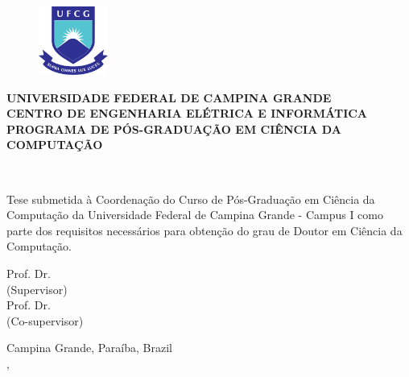\begin{figure}[H]
\centering
\includegraphics[height=85px]{images/logo_ufcg.png}
\end{figure}

\begin{center}
\textbf{UNIVERSIDADE FEDERAL DE CAMPINA GRANDE} \\
\textbf{CENTRO DE ENGENHARIA ELÉTRICA E INFORMÁTICA} \\
\textbf{PROGRAMA DE PÓS-GRADUAÇÃO EM CIÊNCIA DA COMPUTAÇÃO}
\vspace{3em}

\Large{}
\thetitle
\vspace{3em}

\Large{\theauthor}\\
\vspace{2em}

\normalsize{\parbox[t]{122mm}{Tese submetida à Coordenação do Curso de Pós-Graduação em Ciência da Computação da Universidade Federal de Campina Grande - Campus I como parte dos requisitos necessários para obtenção do grau de Doutor em Ciência da Computação.}}
\vspace{6em}


Prof. Dr. \profa\\
(Supervisor) \\
\vspace{1em}
Prof. Dr. \profb\\
(Co-supervisor)
\vfill

Campina Grande, Paraíba, Brazil \\
\MONTH, \the\year
\end{center}